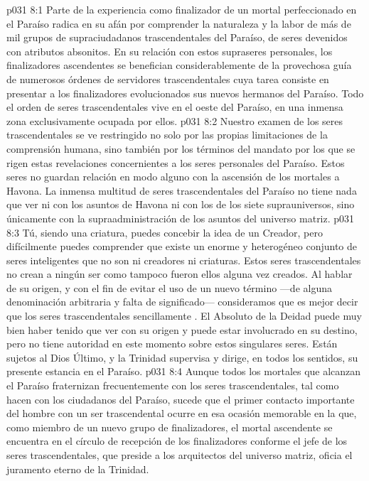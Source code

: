 \vs p031 8:1 Parte de la experiencia como finalizador de un mortal perfeccionado en el Paraíso radica en su afán por comprender la naturaleza y la labor de más de mil grupos de supraciudadanos trascendentales del Paraíso, de seres devenidos con atributos absonitos. En su relación con estos supraseres personales, los finalizadores ascendentes se benefician considerablemente de la provechosa guía de numerosos órdenes de servidores trascendentales cuya tarea consiste en presentar a los finalizadores evolucionados sus nuevos hermanos del Paraíso. Todo el orden de seres trascendentales vive en el oeste del Paraíso, en una inmensa zona exclusivamente ocupada por ellos.
\vs p031 8:2 Nuestro examen de los seres trascendentales se ve restringido no solo por las propias limitaciones de la comprensión humana, sino también por los términos del mandato por los que se rigen estas revelaciones concernientes a los seres personales del Paraíso. Estos seres no guardan relación en modo alguno con la ascensión de los mortales a Havona. La inmensa multitud de seres trascendentales del Paraíso no tiene nada que ver ni con los asuntos de Havona ni con los de los siete suprauniversos, sino únicamente con la supraadministración de los asuntos del universo matriz.
\vs p031 8:3 Tú, siendo una criatura, puedes concebir la idea de un Creador, pero difícilmente puedes comprender que existe un enorme y heterogéneo conjunto de seres inteligentes que no son ni creadores ni criaturas. Estos seres trascendentales no crean a ningún ser como tampoco fueron ellos alguna vez creados. Al hablar de su origen, y con el fin de evitar el uso de un nuevo término ---de alguna denominación arbitraria y falta de significado--- consideramos que es mejor decir que los seres trascendentales sencillamente . El Absoluto de la Deidad puede muy bien haber tenido que ver con su origen y puede estar involucrado en su destino, pero no tiene autoridad en este momento sobre estos singulares seres. Están sujetos al Dios Último, y la Trinidad supervisa y dirige, en todos los sentidos, su presente estancia en el Paraíso.
\vs p031 8:4 Aunque todos los mortales que alcanzan el Paraíso fraternizan frecuentemente con los seres trascendentales, tal como hacen con los ciudadanos del Paraíso, sucede que el primer contacto importante del hombre con un ser trascendental ocurre en esa ocasión memorable en la que, como miembro de un nuevo grupo de finalizadores, el mortal ascendente se encuentra en el círculo de recepción de los finalizadores conforme el jefe de los seres trascendentales, que preside a los arquitectos del universo matriz, oficia el juramento eterno de la Trinidad.
